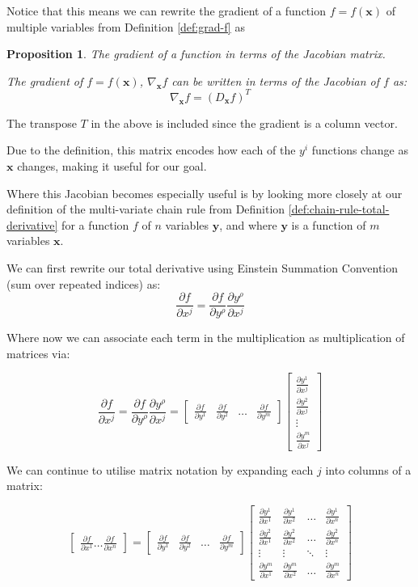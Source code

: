 \documentclass[a4paper]{article}
\theoremstyle{plain} %
\newtheorem{proposition}[theorem]{Proposition}
\theoremstyle{definition} %
\numberwithin{equation}{subsection}
\newcommand{\del}[2]{\frac{\partial #1}{\partial #2}}
\newcommand{\vx}{{\textbf{x}}}
\newcommand{\vy}{{\textbf{y}}}
\begin{document}
Notice that this means we can rewrite the gradient of a function $f = f(\vx)$ 
of multiple variables from Definition \ref{def:grad-f} as 

\begin{proposition} \label{prop:gradient-as-jacobian}
  The gradient of a function in terms of the Jacobian matrix.

  The gradient of $f = f(\vx)$, $\nabla_\vx f$ can be written in terms of the Jacobian of $f$ as:
  \[
  \nabla_\vx f = (D_\vx f)^T
  \] 
\end{proposition}

The transpose $T$ in the above is included since the gradient is a column vector.

Due to the definition, this matrix encodes how each of the $y^i$ functions change as $\vx$ changes, making it useful for our goal.

Where this Jacobian becomes especially useful is by looking more closely at our definition of the multi-variate chain rule from Definition \ref{def:chain-rule-total-derivative} for a function $f$ of $n$ variables $\vy$, and where $\vy$ is a function of $m$ variables $\vx$.

We can first rewrite our total derivative using Einstein Summation Convention (sum over repeated indices) as:
\[ \del{f}{x^j} = \del{f}{y^\rho} \del{y^\rho}{x^j} \]

Where now we can associate each term in the multiplication as multiplication of matrices via:

\[ \del{f}{x^j} = \del{f}{y^\rho} \del{y^\rho}{x^j} = \begin{bmatrix}
  \del{f}{y^1} & \del{f}{y^2} & \dots & \del{f}{y^m}
\end{bmatrix} \begin{bmatrix}
  \del{y^1}{x^j}  \\
  \del{y^2}{x^j}  \\
  \vdots \\
  \del{y^m}{x^j} 
\end{bmatrix}\]

We can continue to utilise matrix notation by expanding each $j$ into columns of a matrix:

\[ \begin{bmatrix}
  \del{f}{x^1} \dots \del{f}{x^n}
\end{bmatrix}
 = \begin{bmatrix}
  \del{f}{y^1} & \del{f}{y^2} & \dots & \del{f}{y^m}
\end{bmatrix} \begin{bmatrix}
  \del{y^1}{x^1} & \del{y^1}{x^2} & \dots & \del{y^1}{x^n} \\
  \del{y^2}{x^1} & \del{y^2}{x^2} & \dots & \del{y^2}{x^n}\\
  \vdots & \vdots & \ddots & \vdots\\
  \del{y^m}{x^1} & \del{y^m}{x^2} & \dots & \del{y^m}{x^n} 
\end{bmatrix}\]
\end{document}
